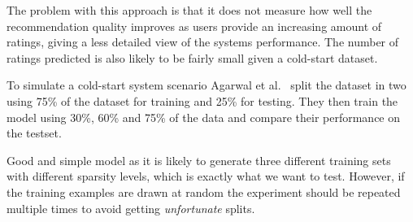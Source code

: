 The problem with this approach is that it does not measure how well the
recommendation quality improves as users provide an increasing amount of
ratings, giving a less detailed view of the systems performance.  The number of
ratings predicted is also likely to be fairly small given a cold-start dataset.

To simulate a cold-start system scenario Agarwal et al.~\cite{Agarwal2009}
split the dataset in two using 75\% of the dataset for training and 25\% for
testing. They then train the model using 30\%, 60\% and 75\% of the data and
compare their performance on the testset.

Good and simple model as it is likely to generate three different training sets
with different sparsity levels, which is exactly what we want to test. However,
if the training examples are drawn at random the experiment should be repeated
multiple times to avoid getting \emph{unfortunate} splits.






